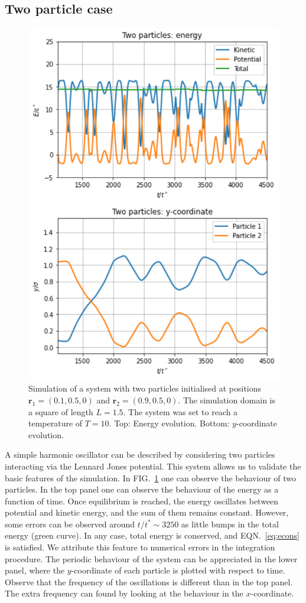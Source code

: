 \documentclass[pra,aps,superscriptaddress,amssymb,amsmath,reprint,noeprint,floatfix]{revtex4-2}
\begin{document}
\subsection{\label{subsec: Two particle case}Two particle case}
\begin{figure}[h]
\centering
\includegraphics[width=0.85\linewidth]{images/two_particles.pdf}
\caption{Simulation of a system with two particles initialised at positions $\mathbf{r}_1=(0.1,0.5,0)$ and $\mathbf{r}_2=(0.9,0.5,0)$. The simulation domain is a square of length $L=1.5$. The system was set to reach a temperature of $T=10$. Top: Energy evolution. Bottom: $y$-coordinate evolution.}
\label{fig:two_particles}
\end{figure}
A simple harmonic oscillator can be described by considering two particles interacting via the Lennard Jones potential. This system allows us to validate the basic features of the simulation. In FIG.\ \ref{fig:two_particles} one can observe the behaviour of two particles. In the top panel one can observe the behaviour of the energy as a function of time. Once equilibrium is reached, the energy oscillates between potential and kinetic energy, and the sum of them remains constant. However, some errors can be observed around $t/t^* \sim 3250$ as little bumps in the total energy (green curve). In any case, total energy is conserved, and EQN.\ \ref{eq:econs} is satisfied. We attribute this feature to numerical errors in the integration procedure. The periodic behaviour of the system can be appreciated in the lower panel, where the $y$-coordinate of each particle is plotted with respect to time. Observe that the frequency of the oscillations is different than in the top panel. The extra frequency can found by looking at the behaviour in the $x$-coordinate.
\end{document}
